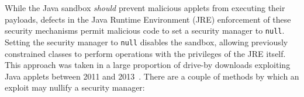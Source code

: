 \documentclass{sig-alternate}
\begin{document}

%
While the Java sandbox \textit{should} prevent malicious applets from
executing their payloads, defects in the
Java Runtime Environment (JRE) enforcement of these security mechanisms permit
malicious code to set a security manager to \texttt{null}.  
Setting the security manager to \texttt{null} disables the sandbox, allowing
previously constrained classes to perform operations with the privileges of 
the JRE itself. 
This approach was taken in a large proportion of drive-by downloads exploiting
Java applets between 2011 and 2013~\cite{fixme-metasploit}. 
%
There are a couple of methods by which an exploit may nullify a security manager:
\end{document}
